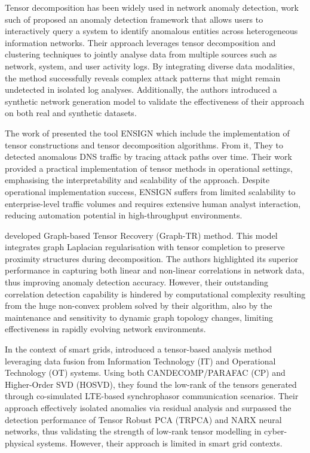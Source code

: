 \documentclass{ieeeaccess}
\begin{document}
Tensor decomposition has been widely used in network anomaly detection, work such of \cite{ranjbar2018qanet} proposed an anomaly detection framework that allows users to interactively query a system to identify anomalous entities across heterogeneous information networks. Their approach leverages tensor decomposition and clustering techniques to jointly analyse data from multiple sources such as network, system, and user activity logs. By integrating diverse data modalities, the method successfully reveals complex attack patterns that might remain undetected in isolated log analyses. Additionally, the authors introduced a synthetic network generation model to validate the effectiveness of their approach on both real and synthetic datasets.


The work of \cite{bruns2016ensign} presented the tool ENSIGN which include the implementation of tensor constructions and tensor decomposition algorithms. From it, They to detected anomalous DNS traffic by tracing attack paths over time. Their work provided a practical implementation of tensor methods in operational settings, emphasising the interpretability and scalability of the approach. Despite operational implementation success, ENSIGN suffers from limited scalability to enterprise-level traffic volumes and requires extensive human analyst interaction, reducing automation potential in high-throughput environments.


\cite{xie2018graph} developed Graph-based Tensor Recovery (Graph-TR) method. This model integrates graph Laplacian regularisation with tensor completion to preserve proximity structures during decomposition. The authors highlighted its superior performance in capturing both linear and non-linear correlations in network data, thus improving anomaly detection accuracy. However, their outstanding correlation detection capability is hindered by computational complexity resulting from the huge non-convex problem solved by their algorithm, also by the maintenance and sensitivity to dynamic graph topology changes, limiting effectiveness in rapidly evolving network environments.

In the context of smart grids, \cite{jafarigiv2023tensor} introduced a tensor-based analysis method leveraging data fusion from Information Technology (IT) and Operational Technology (OT) systems. Using both CANDECOMP/PARAFAC (CP) and Higher-Order SVD (HOSVD), they found the low-rank of the tensors generated through co-simulated LTE-based synchrophasor communication scenarios. Their approach effectively isolated anomalies via residual analysis and surpassed the detection performance of Tensor Robust PCA (TRPCA) and NARX neural networks, thus validating the strength of low-rank tensor modelling in cyber-physical systems. However, their approach is limited in smart grid contexts.
\end{document}
